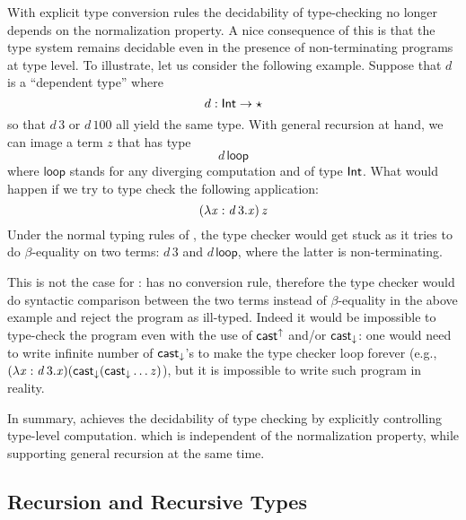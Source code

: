 With explicit type conversion rules the decidability of type-checking 
no longer depends on the normalization property. 
A nice consequence of this is that the type system remains decidable
even in the presence of non-terminating programs at type level.
To illustrate, let us consider the following example. Suppose that $d$ is a ``dependent type'' where
\[d : \mathsf{Int}  \rightarrow  \star\] so that $d\,3$ or $d\,100$ all yield the same
type. With general recursion at hand, we can image a term $z$ that has
type \[d\,\mathsf{loop}\] where $\mathsf{loop}$ stands for any
diverging computation and of type $ \mathsf{Int} $. What would happen if we
try to type check the following application: \[ (  \lambda  \mathit{x}  :  \mathit{d} \, 3  .  \mathit{x}  ) \, \mathit{z}\]
Under the normal typing rules of \coc, the type checker would get
stuck as it tries to do $\beta$-equality on two terms: $d\,3$ and
$d\,\mathsf{loop}$, where the latter is non-terminating.

This is not the case for \name: \name has no conversion rule,
therefore the type checker would do syntactic comparison between the
two terms instead of $\beta$-equality in the above example and reject
the program as ill-typed. Indeed it would be impossible to type-check
the program even with the use of $ \mathsf{cast}^{\uparrow} $ and/or $ \mathsf{cast}_{\downarrow} $:
one would need to write infinite number of $ \mathsf{cast}_{\downarrow} $'s to make
the type checker loop forever (e.g., $(\lambda  \mathit{x}  :  \mathit{d} \, 3  .  \mathit{x})( \mathsf{cast}_{\downarrow} ( \mathsf{cast}_{\downarrow}  \dots z) $), but it is impossible
to write such program in reality.

In summary, \name achieves the decidability of type checking by
explicitly controlling type-level computation.  which is independent of
the normalization property, while supporting general recursion at the
same time.

\subsection{Recursion and Recursive Types}
\label{sec:overview:recursion}


